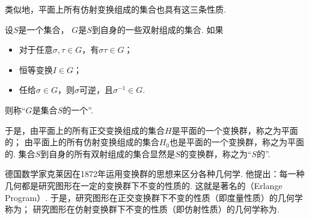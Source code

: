类似地，平面上所有仿射变换组成的集合也具有这三条性质.
\begin{definition}
设\(S\)是一个集合，
\(G\)是\(S\)到自身的一些双射组成的集合.
如果\begin{itemize}
	\item 对于任意\(\sigma,\tau \in G\)，有\(\sigma \tau \in G\)；
	\item 恒等变换\(I \in G\)；
	\item 任给\(\sigma \in G\)，则\(\sigma\)可逆，且\(\sigma^{-1} \in G\).
\end{itemize}
则称“\(G\)是集合\(S\)的一个”.
\end{definition}

于是，由平面上的所有正交变换组成的集合\(H\)是平面的一个变换群，称之为平面的；
由平面上的所有仿射变换组成的集合\(H_0\)也是平面的一个变换群，称之为平面的.
集合\(S\)到自身的所有双射组成的集合显然是\(S\)的变换群，称之为“\(S\)的”.

德国数学家克莱因在1872年运用变换群的思想来区分各种几何学.
他提出：每一种几何都是研究图形在一定的变换群下不变的性质的.
这就是著名的（Erlange Program）.
于是，研究图形在正交变换群下不变的性质（即度量性质）的几何学称为；
研究图形在仿射变换群下不变的性质（即仿射性质）的几何学称为.

